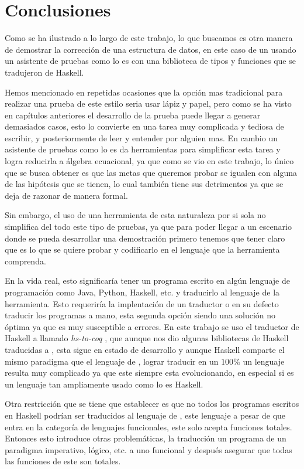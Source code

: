 \chapter{Conclusiones}
Como se ha ilustrado a lo largo de este trabajo, lo que buscamos es otra manera de demostrar la correcci\'on de una estructura de datos,
en este caso de un {\arn} usando un asistente de pruebas como lo es {\coq} con una biblioteca de
tipos y funciones que se tradujeron de Haskell.

Hemos mencionado en repetidas ocasiones que la opci\'on mas tradicional para realizar una prueba de este estilo seria
usar lápiz y papel, pero como se ha visto en capítulos anteriores el desarrollo de la prueba puede llegar a generar demasiados
casos, esto lo convierte en una tarea muy complicada y tediosa de escribir, y posteriormente de leer y
entender por alguien mas. En cambio un asistente de pruebas como lo es {\coq} da herramientas para
simplificar esta tarea y logra reducirla a álgebra ecuacional, ya que como se vio en este trabajo,
lo \'unico que se busca obtener es que las metas que queremos probar se igualen con alguna de las
hip\'otesis que se tienen, lo cual también tiene sus detrimentos ya que se deja de razonar de manera formal.

Sin embargo, el uso de una herramienta de esta naturaleza por si sola no simplifica del todo este
tipo de pruebas, ya que para poder llegar a un escenario donde se pueda desarrollar una demostraci\'on primero
tenemos que tener claro que es lo que se quiere probar y codificarlo en el lenguaje que la
herramienta comprenda.

En la vida real, esto significaría tener un programa escrito en algún lenguaje de programaci\'on
como Java, Python, Haskell, etc. y traducirlo al lenguaje de la herramienta. Esto requeriría la
implentaci\'on de un traductor o en su defecto traducir los programas a mano, esta segunda opci\'on
siendo una soluci\'on no \'optima ya que es muy susceptible a errores. En este trabajo se uso el
traductor de Haskell a {\coq} llamado \textit{hs-to-coq} \cite{thrc}, que aunque nos dio algunas bibliotecas
de Haskell traducidas a {\coq}, esta sigue en estado de desarrollo y aunque Haskell comparte el mismo
paradigma que el lenguaje de {\coq}, lograr traducir en un $100\%$ un lenguaje resulta muy complicado
ya que este siempre esta evolucionando, en especial si es un lenguaje tan ampliamente usado como
lo es Haskell.

Otra restricci\'on que se tiene que establecer es que no todos los programas escritos en Haskell podrían ser traducidos
al lenguaje de {\coq}, este lenguaje a pesar de que entra en la categoría de lenguajes funcionales, este solo acepta funciones totales. Entonces esto introduce otras problemáticas,
la traducción un programa de un paradigma imperativo, l\'ogico, etc. a uno funcional y después
asegurar que todas las funciones de este son totales.

